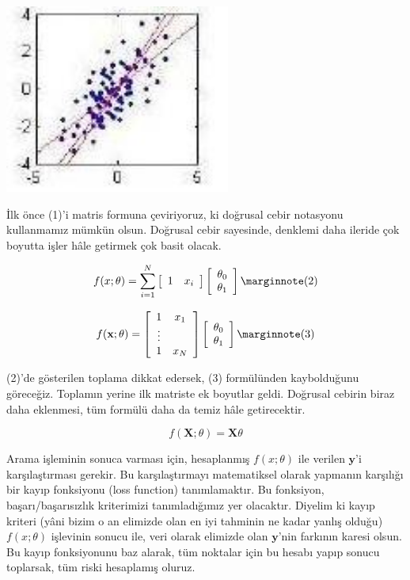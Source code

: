 \documentclass[12pt,fleqn]{article}\usepackage{../../common}
\begin{document}
\includegraphics[width=20em]{linreg.jpg}
 
İlk önce (1)'i matris formuna çeviriyoruz, ki doğrusal cebir
notasyonu kullanmamız mümkün olsun. Doğrusal cebir sayesinde, denklemi daha
ileride çok boyutta işler hâle getirmek çok basit olacak. 

$$
  f(x;\theta) = \sum_{i=1}^N 
  \left[ \begin{array}{cc}
      1 & x_{i}
  \end{array} \right]
  \left[ \begin{array}{c}
      \theta_{0} \\
      \theta_{1}
  \end{array} \right]
  \mlabel{2}
$$

$$
  f(\mathbf{x};\theta) = 
  \left[ \begin{array}{cc}
      1 & x_{1} \\
      \vdots \\
      1 & x_{N} \\      
  \end{array} \right]
  \left[ \begin{array}{c}
      \theta_{0} \\
      \theta_{1}
  \end{array} \right]
  \mlabel{3}
$$

(2)'de gösterilen toplama dikkat edersek, (3) formülünden kaybolduğunu
göreceğiz. Toplamın yerine ilk matriste ek boyutlar geldi. Doğrusal cebirin
biraz daha eklenmesi, tüm formülü daha da temiz hâle getirecektir.

$$  
  f(\mathbf{X};\theta) = \mathbf{X}\theta
$$

Arama işleminin sonuca varması için, hesaplanmış $f(x;\theta)$ ile verilen
$\mathbf{y}$'i karşılaştırması gerekir. Bu karşılaştırmayı matematiksel olarak
yapmanın karşılığı bir kayıp fonksiyonu (loss function) tanımlamaktır. Bu
fonksiyon, başarı/başarısızlık kriterimizi tanımladığımız yer olacaktır. Diyelim
ki kayıp kriteri (yâni bizim o an elimizde olan en iyi tahminin ne kadar yanlış
olduğu) $f(x;\theta)$ işlevinin sonucu ile, veri olarak elimizde olan
$\mathbf{y}$'nin farkının karesi olsun. Bu kayıp fonksiyonunu baz
alarak, tüm noktalar için bu hesabı yapıp sonucu toplarsak, tüm riski
hesaplamış oluruz.  
\end{document}
